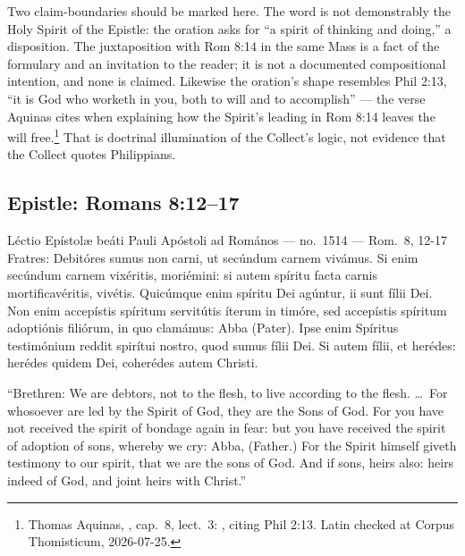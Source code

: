 Two claim-boundaries should be marked here. The word  is not
demonstrably the Holy Spirit of the Epistle: the oration asks for ``a spirit of
thinking and doing,'' a disposition. The juxtaposition with Rom 8:14 in the
same Mass is a fact of the formulary and an invitation to the reader; it is not
a documented compositional intention, and none is claimed. Likewise the
oration's shape resembles Phil 2:13, ``it is God who worketh in you, both to
will and to accomplish'' --- the verse Aquinas cites when explaining how the
Spirit's leading in Rom 8:14 leaves the will free.\footnote{Thomas Aquinas,
, cap.\ 8, lect.\ 3: , citing Phil 2:13. Latin checked at Corpus Thomisticum,
2026-07-25.} That is doctrinal illumination of the Collect's logic, not
evidence that the Collect quotes Philippians.

\subsection{Epistle: Romans 8:12--17 }

\begin{appointed}{Léctio Epístolæ beáti Pauli Apóstoli ad Romános --- no.\ 1514 --- Rom.\ 8, 12-17}
Fratres: Debitóres sumus non carni, ut secúndum carnem vivámus. Si enim
secúndum carnem vixéritis, moriémini: si autem spíritu facta carnis
mortificavéritis, vivétis. Quicúmque enim spíritu Dei agúntur, ii sunt fílii
Dei. Non enim accepístis spíritum servitútis íterum in timóre, sed accepístis
spíritum adoptiónis filiórum, in quo clamámus: Abba (Pater). Ipse enim Spíritus
testimónium reddit spirítui nostro, quod sumus fílii Dei. Si autem fílii, et
herédes: herédes quidem Dei, coherédes autem Christi.
\end{appointed}

\begin{englishwitness}
``Brethren: We are debtors, not to the flesh, to live according to the flesh.
\dots\ For whosoever are led by the Spirit of God, they are the Sons of God.
For you have not received the spirit of bondage again in fear: but you have
received the spirit of adoption of sons, whereby we cry: Abba, (Father.) For
the Spirit himself giveth testimony to our spirit, that we are the sons of God.
And if sons, heirs also: heirs indeed of God, and joint heirs with Christ.''
\end{englishwitness}

